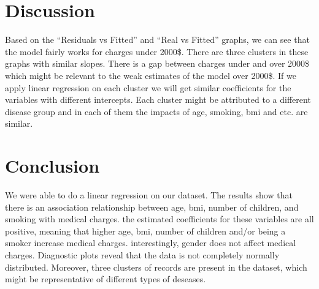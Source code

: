 \documentclass[
]{article}
\begin{document}
\hypertarget{discussion}{%
\section{Discussion}\label{discussion}}

Based on the ``Residuals vs Fitted'' and ``Real vs Fitted'' graphs, we can see that the model fairly works for charges under 2000\$. There are three clusters in these graphs with similar slopes. There is a gap between charges under and over 2000\$ which might be relevant to the weak estimates of the model over 2000\$.
If we apply linear regression on each cluster we will get similar coefficients for the variables with different intercepts. Each cluster might be attributed to a different disease group and in each of them the impacts of age, smoking, bmi and etc. are similar.

\hypertarget{conclusion}{%
\section{Conclusion}\label{conclusion}}

We were able to do a linear regression on our dataset. The results show that there is an association relationship between age, bmi, number of children, and smoking with medical charges. the estimated coefficients for these variables are all positive, meaning that higher age, bmi, number of children and/or being a smoker increase medical charges. interestingly, gender does not affect medical charges. Diagnostic plots reveal that the data is not completely normally distributed. Moreover, three clusters of records are present in the dataset, which might be representative of different types of deseases.
\end{document}
